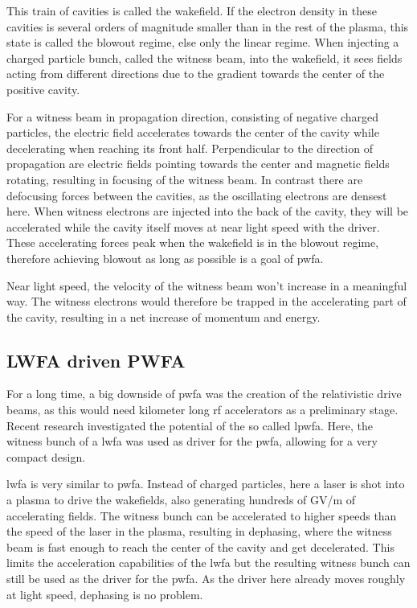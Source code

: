 \documentclass[bachelor_thesis]{subfiles}
\begin{document}
This train of cavities is called the wakefield. If the electron density in these cavities is several orders of magnitude smaller than in the rest of the plasma, this state is called the blowout regime, else only the linear regime.
When injecting a charged particle bunch, called the witness beam, into the wakefield, it sees fields acting from different directions due to the gradient towards the center of the positive cavity. 

For a witness beam in propagation direction, consisting of negative charged particles, the electric field accelerates towards the center of the cavity while decelerating when reaching its front half. 
Perpendicular to the direction of propagation are electric fields pointing towards the center and magnetic fields rotating, resulting in focusing of the witness beam. In contrast there are defocusing forces between the cavities, as the oscillating electrons are densest here.
When witness electrons are injected into the back of the cavity, they will be accelerated while the cavity itself moves at near light speed with the driver.
These accelerating forces peak when the wakefield is in the blowout regime, therefore achieving blowout as long as possible is a goal of \gls{pwfa}.

Near light speed, the velocity of the witness beam won't increase in a meaningful way. The witness electrons would therefore be trapped in the accelerating part of the cavity, resulting in a net increase of momentum and energy.

\subsection{LWFA driven PWFA} \label{chap:lpfwa}
For a long time, a big downside of \gls{pwfa} was the creation of the relativistic drive beams, as this would need kilometer long \gls{rf} accelerators as a preliminary stage. Recent research \cite{Kurz2021} investigated the potential of the so called \gls{lpwfa}.
Here, the witness bunch of a \gls{lwfa} was used as driver for the \gls{pwfa}, allowing for a very compact design.

\Gls{lwfa} is very similar to \gls{pwfa}. Instead of charged particles, here a laser is shot into a plasma to drive the wakefields, also generating hundreds of \unit{\giga\volt/\m} of accelerating fields.
The witness bunch can be accelerated to higher speeds than the speed of the laser in the plasma, resulting in dephasing, where the witness beam is fast enough to reach the center of the cavity and get decelerated. This limits the acceleration capabilities of the \gls{lwfa}
 but the resulting witness bunch can still be used as the driver for the \gls{pwfa}. As the driver here already moves roughly at light speed, dephasing is no problem. 
\end{document}
